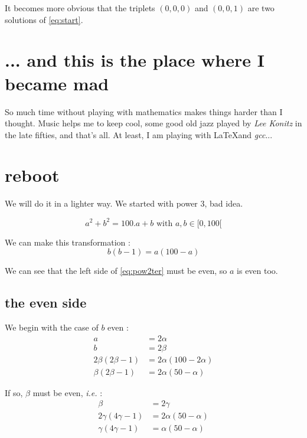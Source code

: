 It becomes more obvious that the triplets $(0, 0, 0)$ and $(0, 0, 1)$ are two solutions of \eqref{eq:start}.

\section{... and this is the place where I became mad}
So much time without playing with mathematics makes things harder than I thought. Music helps me to keep cool, some good old jazz played by \emph{Lee Konitz} in the late fifties, and that's all. At least, I am playing with \LaTeX and \emph{gcc}...

\section{reboot}
We will do it in a lighter way. We started with power 3, bad idea. 

\begin{equation}\label{eq:pow2}
	a^2 + b^2 = 100.a + b \text{ with } a, b \in [0, 100[
\end{equation}

We can make this transformation :
\begin{equation}\label{eq:pow2bis}
	b(b-1) = a(100 - a)
\end{equation}

We can see that the left side of \eqref{eq:pow2ter} must be even, so $a$ is even too.

\subsection{the even side}
We begin with the case of $b$ even :
\begin{equation}\label{eq:pow2ter}
\begin{split}
	a &= 2 \alpha \\
	b &= 2 \beta \\
	2 \beta(2 \beta - 1) &= 2 \alpha(100 - 2 \alpha) \\
	\beta(2\beta - 1) &= 2 \alpha(50 - \alpha)
\end{split}
\end{equation}

If so, $\beta$ must be even, \emph{i.e.} :
\begin{equation}\label{eq:pow2:4}
\begin{split}
	\beta &= 2 \gamma \\
	2 \gamma (4 \gamma - 1) &= 2 \alpha (50 - \alpha) \\
	\gamma (4 \gamma - 1) &= \alpha (50 - \alpha)
\end{split}
\end{equation}

